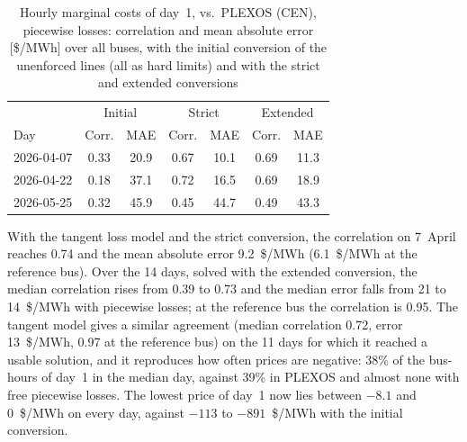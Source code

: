 \begin{table}[t]
  \centering
  \caption{Hourly marginal costs of day~1, \gtopt{} vs.\ PLEXOS (CEN),
    piecewise losses: correlation and mean absolute error [\$/MWh] over
    all buses, with the initial conversion of the unenforced lines (all
    as hard limits) and with the strict and extended conversions}
  \label{tab:cen_cmg}
  \setlength{\tabcolsep}{4pt}
  \begin{tabular}{@{}lcccccc@{}}
    \toprule
    & \multicolumn{2}{c}{Initial} & \multicolumn{2}{c}{Strict}
    & \multicolumn{2}{c}{Extended} \\
    Day & Corr. & MAE & Corr. & MAE & Corr. & MAE \\
    \midrule
    2026-04-07 & 0.33 & 20.9 & 0.67 & 10.1 & 0.69 & 11.3 \\
    2026-04-22 & 0.18 & 37.1 & 0.72 & 16.5 & 0.69 & 18.9 \\
    2026-05-25 & 0.32 & 45.9 & 0.45 & 44.7 & 0.49 & 43.3 \\
    \bottomrule
  \end{tabular}
\end{table}

With the tangent loss model and the strict conversion, the correlation
on 7~April reaches 0.74 and the mean absolute error 9.2~\$/MWh
(6.1~\$/MWh at the reference bus).  Over the 14 days, solved with the
extended conversion, the median correlation rises from 0.39 to 0.73 and
the median error falls from 21 to 14~\$/MWh with piecewise losses; at
the reference bus the correlation is 0.95.  The tangent model gives a
similar agreement (median correlation 0.72, error 13~\$/MWh, 0.97 at the
reference bus) on the 11 days for which it reached a usable solution,
and it reproduces how often prices are negative: 38\% of the bus-hours
of day~1 in the median day, against 39\% in PLEXOS and almost none with
free piecewise losses.  The lowest price of day~1 now lies between
$-8.1$ and 0~\$/MWh on every day, against $-113$ to $-891$~\$/MWh with
the initial conversion.

